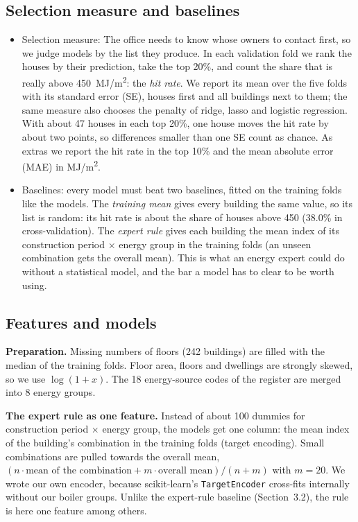 \documentclass[11pt,a4paper]{article}
\begin{document}
\subsection{Selection measure and baselines}

\begin{itemize}
  \item Selection measure: The office needs to know whose owners to contact first, so we judge models by the list they
produce. In each validation fold we rank the houses by their prediction, take the top 20\%, and
count the share that is really above 450~MJ/m\textsuperscript{2}: the \emph{hit rate}. We report
its mean over the five folds with its standard error (SE), houses first and all buildings next to
them; the same measure also chooses the penalty of ridge, lasso and logistic regression. With
about 47 houses in each top 20\%, one house moves the hit rate by about two points, so differences
smaller than one SE count as chance. As extras we report the hit rate in the top 10\% and the mean
absolute error (MAE) in MJ/m\textsuperscript{2}.
  \item Baselines: every model must beat two baselines, fitted on the training folds like the models.
The \emph{training mean} gives every building the same value, so its list is random: its hit rate is
about the share of houses above 450 (38.0\% in cross-validation). The \emph{expert rule} gives each
building the mean index of its construction period $\times$ energy group in the training folds
(an unseen combination gets the overall mean). This is what an energy expert could do without a
statistical model, and the bar a model has to clear to be worth using.
\end{itemize}

\subsection{Features and models}
\textbf{Preparation.} Missing numbers of floors (242 buildings) are filled with the median of the training folds.
Floor area, floors and dwellings are strongly skewed, so we use $\log(1+x)$. The 18 energy-source codes of the
register are merged into 8 energy groups.

\textbf{The expert rule as one feature.} Instead of about 100 dummies for construction period $\times$ energy group,
the models get one column: the mean index of the building's combination in the training folds (target encoding).
Small combinations are pulled towards the overall mean, $(n \cdot \text{mean of the combination} + m \cdot
\text{overall mean}) / (n + m)$ with $m = 20$. We wrote our own encoder, because scikit-learn's
\texttt{TargetEncoder} cross-fits internally without our boiler groups. Unlike the expert-rule baseline
(Section~3.2), the rule is here one feature among others.
\end{document}

